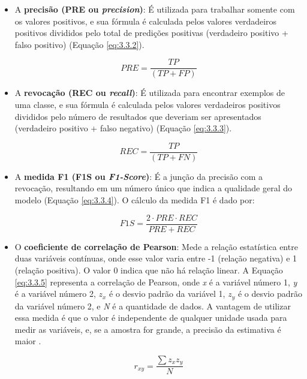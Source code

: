 \begin{itemize}
    \item A \textbf{precisão (PRE ou \textit{precision})}: É utilizada para trabalhar somente com os valores positivos, e sua fórmula é calculada pelos valores verdadeiros positivos divididos pelo total de predições positivas (verdadeiro positivo + falso positivo) (Equação \ref{eq:3.3.2}).
    
    \begin{equation}
        PRE = \frac {TP} {(TP + FP)}
        \label{eq:3.3.2}
    \end{equation}

    \item A \textbf{revocação (REC ou \textit{recall})}: É utilizada para encontrar exemplos de uma classe, e sua fórmula é calculada pelos valores verdadeiros positivos divididos pelo número de resultados que deveriam ser apresentados (verdadeiro positivo + falso negativo) (Equação \ref{eq:3.3.3}).
    
    \begin{equation}
        REC = \frac {TP} {(TP + FN)}
        \label{eq:3.3.3}
    \end{equation}

    \item A \textbf{medida F1 (F1S ou \textit{F1-Score})}: É a junção da precisão com a revocação, resultando em um número único que indica a qualidade geral do modelo (Equação \ref{eq:3.3.4}). O cálculo da medida F1 é dado por:
    
    \begin{equation}
        F1S = \frac {2 \cdot PRE \cdot REC} {PRE + REC}
        \label{eq:3.3.4}
    \end{equation}

    \item O \textbf{coeficiente de correlação de Pearson}: Mede a relação estatística entre duas variáveis contínuas, onde esse valor varia entre -1 (relação negativa) e 1 (relação positiva). O valor 0 indica que não há relação linear. A Equação \ref{eq:3.3.5} representa a correlação de Pearson, onde \textit{x} é a variável número 1, \textit{y} é a variável número 2, \textit{$z_{x}$} é o desvio padrão da variável 1, \textit{$z_{y}$} é o desvio padrão da variável número 2, e \textit{N} é a quantidade de dados. A vantagem de utilizar essa medida é que o valor é independente de qualquer unidade usada para medir as variáveis, e, se a amostra for grande, a precisão da estimativa é maior \cite{mukaka2012}.
    
    \begin{equation}
        r_{xy} = \frac {\sum z_{x}z_{y}}{N}
        \label{eq:3.3.5}
    \end{equation}
    

\end{itemize}
